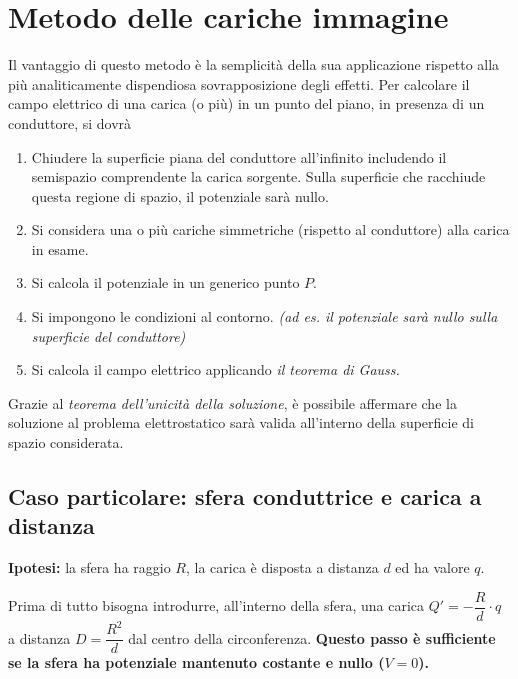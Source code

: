 \documentclass{article}
\begin{document}
\newpage

\section{Metodo delle cariche immagine}
Il vantaggio di questo metodo è la semplicità della sua applicazione rispetto alla più analiticamente dispendiosa sovrapposizione degli effetti.
Per calcolare il campo elettrico di una carica (o più) in un punto del piano, in presenza di un conduttore, si dovrà
\begin{enumerate}
	\item Chiudere la superficie piana del conduttore all'infinito includendo il semispazio comprendente la carica sorgente. Sulla superficie che racchiude questa regione di spazio, il potenziale sarà nullo.
	\item Si considera una o più cariche simmetriche (rispetto al conduttore) alla carica in esame.
	\item Si calcola il potenziale in un generico punto \(P\).
	\item Si impongono le condizioni al contorno. \textit{(ad es. il potenziale sarà nullo sulla superficie del conduttore)}
	\item Si calcola il campo elettrico applicando \textit{il teorema di Gauss.}
\end{enumerate}
Grazie al \textit{teorema dell'unicità della soluzione}, è possibile affermare che la soluzione al problema elettrostatico sarà valida all'interno della superficie di spazio considerata.

\subsection{Caso particolare: sfera conduttrice e carica a distanza}
\textbf{Ipotesi:} la sfera ha raggio \(R\), la carica è disposta a distanza \(d\) ed ha valore \(q\).

Prima di tutto bisogna introdurre, all'interno della sfera, una carica \(Q'  = -\dfrac{R}{d} \cdot q\) a distanza \( D = \dfrac{R^2}{d}\) dal centro della circonferenza. \textbf{Questo passo è sufficiente se la sfera ha potenziale mantenuto costante e nullo (\(V=0\)).}
\end{document}
